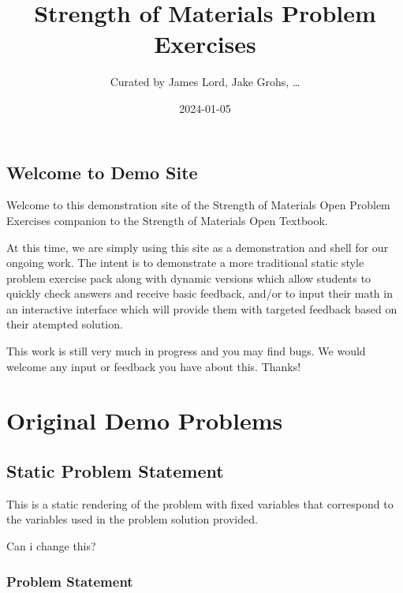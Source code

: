 \documentclass[
  letterpaper,
  DIV=11,
  numbers=noendperiod]{scrreprt}
\title{Strength of Materials Problem Exercises}
\author{Curated by James Lord, Jake Grohs, \ldots{}}
\date{2024-01-05}
\renewcommand*\contentsname{Table of contents}
\newcommand\contentsname{Table of contents}
\begin{document}
\maketitle

\renewcommand*\contentsname{Table of contents}
{
\hypersetup{linkcolor=}
\setcounter{tocdepth}{2}
\tableofcontents
}

\chapter*{Welcome to Demo Site}\label{welcome-to-demo-site}


Welcome to this demonstration site of the Strength of Materials Open
Problem Exercises companion to the Strength of Materials Open Textbook.

At this time, we are simply using this site as a demonstration and shell
for our ongoing work. The intent is to demonstrate a more traditional
static style problem exercise pack along with dynamic versions which
allow students to quickly check answers and receive basic feedback,
and/or to input their math in an interactive interface which will
provide them with targeted feedback based on their atempted solution.

This work is still very much in progress and you may find bugs. We would
welcome any input or feedback you have about this. Thanks!

\part{Original Demo Problems}

\chapter*{Static Problem Statement}\label{static-problem-statement}


This is a static rendering of the problem with fixed variables that
correspond to the variables used in the problem solution provided.

Can i change this?

\section*{Problem Statement}\label{problem-statement}
\end{document}
